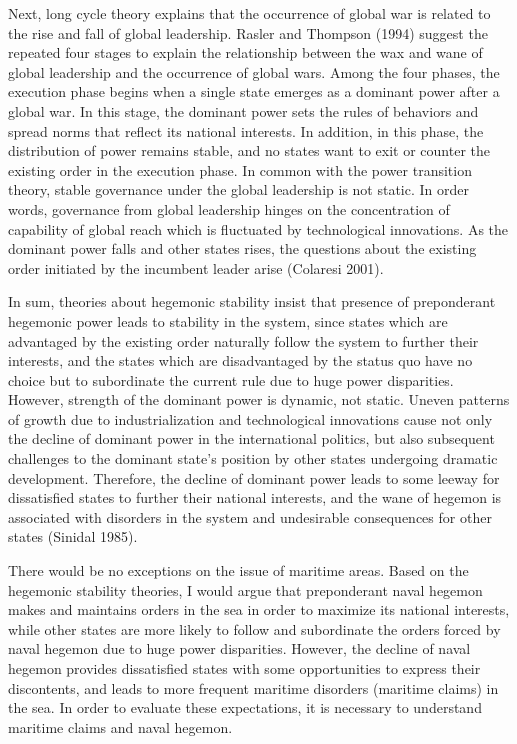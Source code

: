 \documentclass{article}
\begin{document}
Next, long cycle theory explains that the occurrence of global war is related to the rise and fall of global leadership. Rasler and Thompson (1994) suggest the repeated four stages to explain the relationship between the wax and wane of global leadership and the occurrence of global wars. Among the four phases, the execution phase begins when a single state emerges as a dominant power after a global war. In this stage, the dominant power sets the rules of behaviors and spread norms that reflect its national interests. In addition, in this phase, the distribution of power remains stable, and no states want to exit or counter the existing order in the execution phase. In common with the power transition theory, stable governance under the global leadership is not static. In order words, governance from global leadership hinges on the concentration of capability of global reach which is fluctuated by technological innovations. As the dominant power falls and other states rises, the questions about the existing order initiated by the incumbent leader arise (Colaresi 2001).

In sum, theories about hegemonic stability insist that presence of preponderant hegemonic power leads to stability in the system, since states which are advantaged by the existing order naturally follow the system to further their interests, and the states which are disadvantaged by the status quo have no choice but to subordinate the current rule due to huge power disparities. However, strength of the dominant power is dynamic, not static. Uneven patterns of growth due to industrialization and technological innovations cause not only the decline of dominant power in the international politics, but also subsequent challenges to the dominant state’s position by other states undergoing dramatic development. Therefore, the decline of dominant power leads to some leeway for dissatisfied states to further their national interests, and the wane of hegemon is associated with disorders in the system and undesirable consequences for other states (Sinidal 1985).  

There would be no exceptions on the issue of maritime areas. Based on the hegemonic stability theories, I would argue that preponderant naval hegemon makes and maintains orders in the sea in order to maximize its national interests, while other states are more likely to follow and subordinate the orders forced by naval hegemon due to huge power disparities. However, the decline of naval hegemon provides dissatisfied states with some opportunities to express their discontents, and leads to more frequent maritime disorders (maritime claims) in the sea. In order to evaluate these expectations, it is necessary to understand maritime claims and naval hegemon. 
\end{document}
